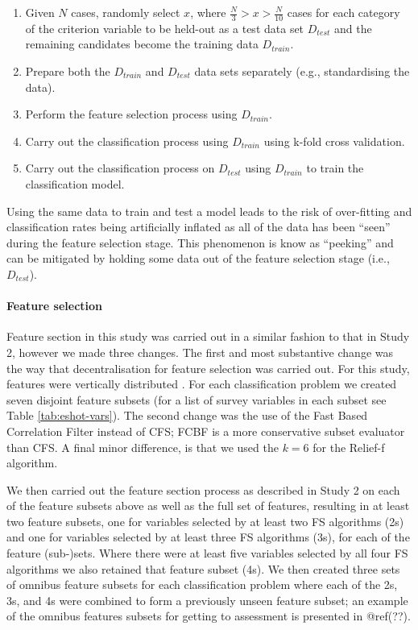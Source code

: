 \documentclass[a4paper,]{book}
\providecommand{\tightlist}{%
  \setlength{\itemsep}{0pt}\setlength{\parskip}{0pt}}
\let\oldparagraph\paragraph
\renewcommand{\paragraph}[1]{\oldparagraph{#1}\mbox{}}
\begin{document}
\begin{enumerate}
\def\labelenumi{\arabic{enumi}.}
\tightlist
\item
  Given \(N\) cases, randomly select \(x\), where \(\frac{N}{3} > x > \frac{N}{10}\) cases for each category of the criterion variable to be held-out as a test data set \(D_{test}\) and the remaining candidates become the training data \(D_{train}\).
\item
  Prepare both the \(D_{train}\) and \(D_{test}\) data sets separately (e.g., standardising the data).
\item
  Perform the feature selection process using \(D_{train}\).
\item
  Carry out the classification process using \(D_{train}\) using k-fold cross validation.
\item
  Carry out the classification process on \(D_{test}\) using \(D_{train}\) to train the classification model.
\end{enumerate}

Using the same data to train and test a model leads to the risk of over-fitting and classification rates being artificially inflated as all of the data has been ``seen'' during the feature selection stage. This phenomenon is know as ``peeking'' \citep{Kuncheva2018, Reunanen2003a, Smialowski2010} and can be mitigated by holding some data out of the feature selection stage (i.e., \(D_{test}\)).

\hypertarget{feature-selection}{%
\paragraph{Feature selection}\label{feature-selection}}

Feature section in this study was carried out in a similar fashion to that in Study 2, however we made three changes. The first and most substantive change was the way that decentralisation for feature selection was carried out. For this study, features were vertically distributed \citep[i.e., split by features and not by case;][]{Bolon-Canedo2015}. For each classification problem we created seven disjoint feature subsets (for a list of survey variables in each subset see Table \ref{tab:eshot-vars}). The second change was the use of the Fast Based Correlation Filter \citep[FCBF;][]{Yu2003} instead of CFS; FCBF is a more conservative subset evaluator than CFS. A final minor difference, is that we used the \(k = 6\) for the Relief-f algorithm.

We then carried out the feature section process as described in Study 2 on each of the feature subsets above as well as the full set of features, resulting in at least two feature subsets, one for variables selected by at least two FS algorithms (2s) and one for variables selected by at least three FS algorithms (3s), for each of the feature (sub-)sets. Where there were at least five variables selected by all four FS algorithms we also retained that feature subset (4s). We then created three sets of omnibus feature subsets for each classification problem where each of the 2s, 3s, and 4s were combined to form a previously unseen feature subset; an example of the omnibus features subsets for getting to assessment is presented in @ref(??).
\end{document}
